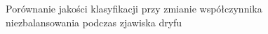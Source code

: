 \begin{figure}[h]
    \centering
    \qquad
    \caption{Porównanie jakości klasyfikacji przy zmianie współczynnika niezbalansowania podczas zjawiska dryfu}\label{Figure:DriftImbalance}
\end{figure}

